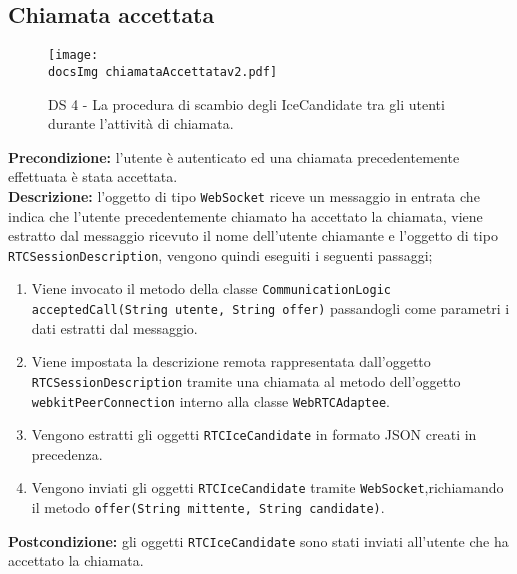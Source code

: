 \begin{sloppypar}
\subsection{Chiamata accettata}
\begin{center}
				\begin{figure}[h!tbp]
					\centering
					\texttt{[image: \\docsImg  chiamataAccettatav2.pdf]}
				\caption{DS 4 - La procedura di scambio degli IceCandidate tra gli utenti durante l'attività di chiamata.}	
				\end{figure}
			\end{center}
\noindent \textbf{Precondizione: }l'utente è autenticato ed una chiamata precedentemente effettuata è stata accettata.\\
\textbf{Descrizione: }l'oggetto di tipo \texttt{WebSocket} riceve un messaggio in entrata che indica che l'utente precedentemente chiamato ha accettato la chiamata, viene estratto dal messaggio ricevuto il nome dell'utente chiamante e l'oggetto di tipo \texttt{RTCSessionDescription}, vengono quindi eseguiti i seguenti passaggi;
\begin{enumerate}
	\item Viene invocato il metodo della classe \texttt{CommunicationLogic acceptedCall(String utente, String offer)} passandogli come parametri i dati estratti dal messaggio.
	\item Viene impostata la descrizione remota rappresentata dall'oggetto \texttt{RTCSessionDescription} tramite una chiamata al metodo dell'oggetto \texttt{webkitPeerConnection} interno alla classe \texttt{WebRTCAdaptee}.
	\item Vengono estratti gli oggetti \texttt{RTCIceCandidate} in formato JSON creati in precedenza.
	\item Vengono inviati gli oggetti \texttt{RTCIceCandidate} tramite \texttt{WebSocket},richiamando il metodo \texttt{offer(String mittente, String candidate)}.
\end{enumerate}
\textbf{Postcondizione: } gli oggetti \texttt{RTCIceCandidate} sono stati inviati all'utente che ha accettato la chiamata.

\newpage


\end{sloppypar}
